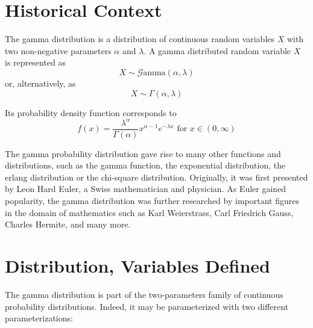 \documentclass[12pt]{article}
\newcommand{\G}{\mathcal{G}}
\begin{document}
\singlespacing

\tableofcontents\pagebreak
\doublespacing
\section{Historical Context}
The gamma distribution is a distribution of continuous random variables $X$ with two non-negative parameters
$\alpha$ and $\lambda$. A gamma distributed random variable $X$ is represented as 
\begin{equation}
	X\sim\G\text{amma}(\alpha, \lambda)
\end{equation}
or, alternatively, as 
\begin{equation}
	X\sim\Gamma(\alpha,\lambda)
\end{equation}

Its probability density function corresponds to 
\begin{equation}
	f(x)=\frac{\lambda^\alpha}{\Gamma(\alpha)}x^{\alpha-1}e^{-\lambda x}\text{ for }x\in(0,\infty)
\end{equation}


The gamma probability distribution gave rise to many other functions and distributions, such as the gamma function, the exponential
distribution, the erlang distribution or the chi-square distribution. Originally, it was first presented by Leon Hard Euler,
a Swiss mathematician and physician. As Euler gained popularity, the gamma distribution was further researched by
important figures in the domain of mathematics such as Karl Weierstrass, Carl Friedrich Gauss, Charles Hermite, and many
more\cite{hoschGammaDistribution2017, wikipediaGammaDistribution2022, sebahIntroductionGammaFunction2002}.


\pagebreak
\section{Distribution, Variables Defined}
The gamma distribution is part of the two-parameters family of continuous probability distributions. Indeed, it may be
parameterized with two different parameterizations\cite{wikipediaGammaDistribution2022}:
\end{document}
